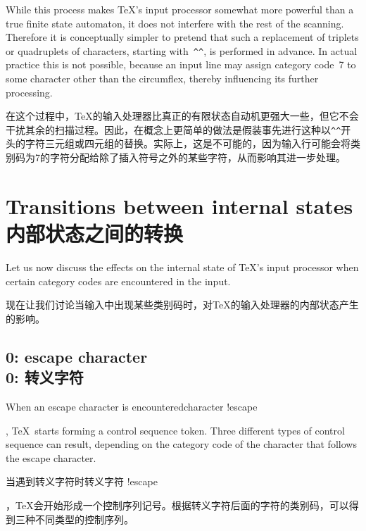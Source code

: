 While this process makes \TeX's input processor
somewhat more powerful
than a true finite state automaton,
it does not interfere with the rest of
the scanning. Therefore it is conceptually simpler to pretend that
such a replacement of triplets or quadruplets
of characters, starting with~\verb>^^>, is performed in advance. 
In actual practice this is not possible,
because an
input line may assign category code~7 to some 
character other than the circumflex, thereby 
influencing its further processing.

在这个过程中，\TeX 的输入处理器比真正的有限状态自动机更强大一些，但它不会干扰其余的扫描过程。因此，在概念上更简单的做法是假装事先进行这种以\verb>^^>开头的字符三元组或四元组的替换。实际上，这是不可能的，因为输入行可能会将类别码为7的字符分配给除了插入符号之外的某些字符，从而影响其进一步处理。



\section{Transitions between internal states\\内部状态之间的转换}

Let us now discuss the effects on the internal state
of \TeX's input processor when
certain category codes are encountered in the input. 

现在让我们讨论当输入中出现某些类别码时，对\TeX 的输入处理器的内部状态产生的影响。


\subsection{0: escape character\\0: 转义字符}%

When an escape character is encountered\term character !escape\par,
\TeX\ starts forming a control sequence token.
Three different types of control sequence can result,
depending on the category code of the character that
follows the escape character.

当遇到转义字符时\term 转义字符 !escape\par，\TeX 会开始形成一个控制序列记号。根据转义字符后面的字符的类别码，可以得到三种不同类型的控制序列。


